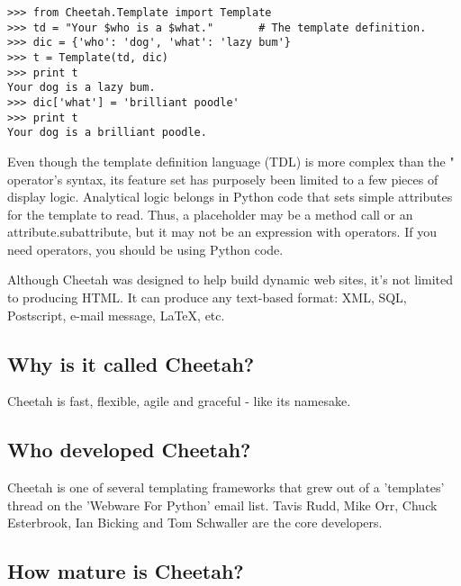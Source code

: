 \begin{verbatim}
>>> from Cheetah.Template import Template
>>> td = "Your $who is a $what."       # The template definition.
>>> dic = {'who': 'dog', 'what': 'lazy bum'}
>>> t = Template(td, dic)
>>> print t
Your dog is a lazy bum.
>>> dic['what'] = 'brilliant poodle'
>>> print t
Your dog is a brilliant poodle.
\end{verbatim}

Even though the template definition language (TDL) is more complex than the "%
operator's syntax, its feature set has purposely been limited to a few pieces
of display logic.  Analytical logic belongs in Python code that sets simple
attributes for the template to read.  Thus, a placeholder may be a method call
or an attribute.subattribute, but it may not be an expression with operators.
If you need operators, you should be using Python code.

Although Cheetah was designed to help build dynamic web sites, it's not limited
to producing HTML.  It can produce any text-based format: XML, SQL, Postscript,
e-mail message, LaTeX, etc.



\subsection{Why is it called Cheetah?}
\label{intro.name}

Cheetah is fast, flexible, agile and graceful - like its namesake. 


\subsection{Who developed Cheetah?}
\label{intro.developers}

Cheetah is one of several templating frameworks that grew out of a 'templates'
thread on the 'Webware For Python' email list.  Tavis Rudd, Mike Orr, Chuck
Esterbrook, Ian Bicking and Tom Schwaller are the core developers.

\subsection{How mature is Cheetah?}
\label{intro.mature}

